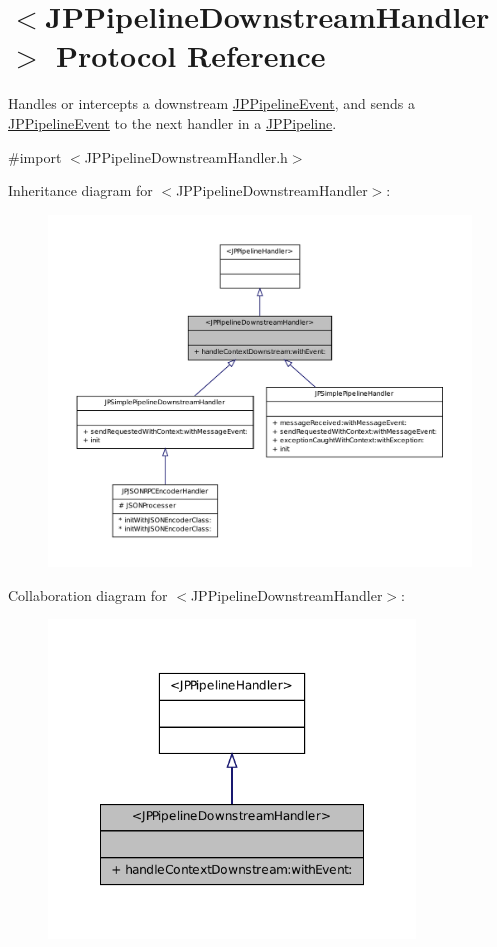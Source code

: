 \hypertarget{a00021}{
\section{$<$JPPipelineDownstreamHandler$>$ Protocol Reference}
\label{a00021}
}


Handles or intercepts a downstream \hyperlink{a00023}{JPPipelineEvent}, and sends a \hyperlink{a00023}{JPPipelineEvent} to the next handler in a \hyperlink{a00019}{JPPipeline}.  




{\ttfamily \#import $<$JPPipelineDownstreamHandler.h$>$}



Inheritance diagram for $<$JPPipelineDownstreamHandler$>$:\nopagebreak
\begin{figure}[H]
\begin{center}
\leavevmode
\includegraphics[width=400pt]{a00124}
\end{center}
\end{figure}


Collaboration diagram for $<$JPPipelineDownstreamHandler$>$:\nopagebreak
\begin{figure}[H]
\begin{center}
\leavevmode
\includegraphics[width=276pt]{a00125}
\end{center}
\end{figure}
